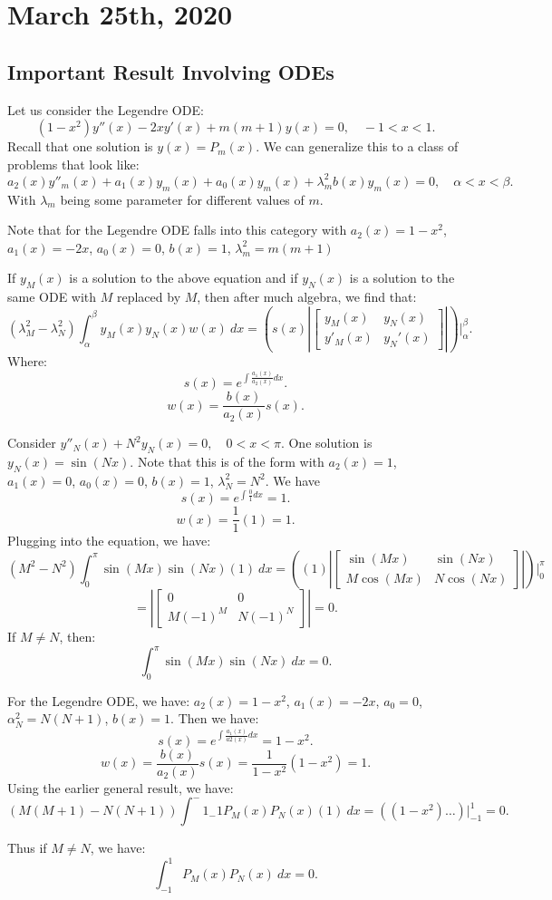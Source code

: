 \documentclass[../main/main.tex]{subfiles}
\begin{document}
\section{March 25th, 2020}
\subsection{Important Result Involving ODEs}
Let us consider the Legendre ODE: \[
	(1-x^2)y''(x) -2xy'(x) + m(m+1) y(x) = 0, \quad -1 < x < 1
.\] Recall that one solution is $y(x) = P_m(x)$. We can generalize this to a class of problems that look like:  \[
a_2(x) y''_m(x) + a_1(x) y_m(x) + a_0(x) y_m(x) + \lambda_m^2b(x) y_m(x) = 0, \quad \alpha < x < \beta
.\] With $\lambda_m$ being some parameter for different values of $m$.
\begin{remark}
	Note that for the Legendre ODE falls into this category with $a_2(x) = 1-x^2$, $a_1(x) = -2x$, $a_0(x) = 0$, $b(x) = 1$, $\lambda_m^2=m(m+1)$
\end{remark}
\begin{theorem}
	If $y_M(x) $ is a solution to the above equation and if $y_N(x)$ is a solution to the same ODE with $M$ replaced by $M$, then after much algebra, we find that: \[
	\left( \lambda_M^2-\lambda_N^2 \right) \int^\beta_\alpha y_M(x)y_N(x)w(x)~dx = \left( s(x)\left| \begin{bmatrix} y_M(x) & y_N(x) \\ y'_M(x) &y_N'(x) \end{bmatrix}\right|  \right) \bigg\rvert_\alpha^\beta
	.\] 
	Where: \[
		s(x) = e^{\int \frac{a_1(x)}{a_2(x)}dx}
	.\] \[
	w(x) = \frac{b(x)}{a_2(x)}s(x)
	.\] 
\end{theorem}
\begin{example}
	Consider $y''_N(x) + N^2y_N(x) = 0, \quad 0<x<\pi$. One solution is $y_N(x) = \sin(Nx)$. Note that this is of the form with $a_2(x) = 1$, $a_1(x) = 0$, $a_0(x) = 0$, $b(x) = 1$, $\lambda_N^2=N^2$. We have \[
		s(x) = e^{\int \frac{0}{1}dx}=1
	.\] \[
	w(x) = \frac{1}{1}(1)=1
	.\] Plugging into the equation, we have: \[
(M^2-N^2)\int^\pi_0 \sin(Mx) \sin(Nx) (1)~dx = \left( (1)\left| \begin{bmatrix} \sin(Mx)&\sin(Nx)\\M\cos(Mx)&N\cos(Nx) \end{bmatrix}  \right|  \right) \bigg\rvert^\pi_0 \]\[= \left| \begin{bmatrix} 0&0\\M(-1)^{M} &N(-1)^{N} \end{bmatrix}  \right| =0
	.\] If $M\neq N$, then: \[
	\int^\pi_0 \sin(Mx) \sin(Nx) ~dx = 0
	.\] 
\end{example}
	For the Legendre ODE, we have: $a_2(x)=1-x^2$, $a_1(x) = -2x$, $a_0=0$, $\alpha_N^2=N(N+1)$, $ b(x)=1$. Then we have: \[
		s(x) = e^{\int \frac{a_1(x)}{a2(x)}dx} = 1-x^2
	.\] \[
	w(x) = \frac{b(x)}{a_2(x)}s(x) = \frac{1}{1-x^2}(1-x^2) = 1
	.\] Using the earlier general result, we have: \[
\left( M(M+1)-N(N+1) \right) \int^-1_-1 P_M(x)P_N(x)(1) ~dx = \left( (1-x^2) \ldots \right)\bigg\rvert^1_{-1} = 0
	.\]
\begin{theorem}
	Thus if $M\neq N$, we have: \[
		\int^1_{-1} P_M(x)P_N(x)~dx = 0
	.\] 
\end{theorem}	
\end{document}
